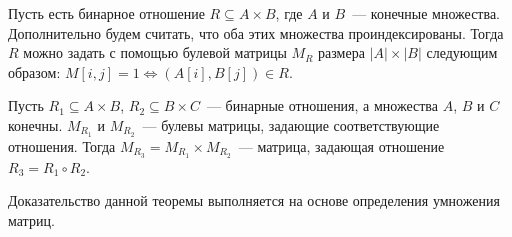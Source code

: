 Пусть есть бинарное отношение $R \subseteq A \times B$, где $A$ и $B$~--- конечные множества.
Дополнительно будем считать, что оба этих множества проиндексированы.
Тогда $R$ можно задать с помощью булевой матрицы $M_R$ размера $|A|\times|B|$ следующим образом: $M[i,j] = 1 \iff (A[i],B[j]) \in R$.

\begin{theorem}
    Пусть $R_1 \subseteq A \times B$, $R_2 \subseteq B \times C$~--- бинарные отношения, а множества $A$, $B$ и $C$ конечны.
    $M_{R_1}$ и $M_{R_2}$~--- булевы матрицы, задающие соответствующие отношения.
    Тогда $M_{R_3} = M_{R_1} \times M_{R_2}$~--- матрица, задающая отношение $R_3 = R_1 \circ R_2$.
\end{theorem}

Доказательство данной теоремы выполняется на основе определения умножения матриц.

